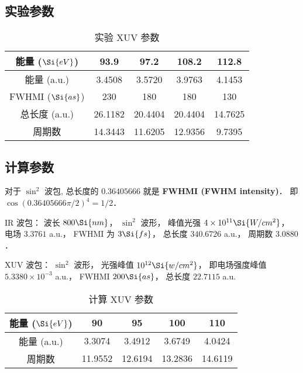 
\subsection{实验参数}
\begin{table}[ht]
\centering
\caption{实验 XUV 参数}\label{Osiand_tab1}
\begin{tabular}{|c|c|c|c|c|}
\hline
能量 ($\Si{eV}$) & 93.9 & 97.2 & 108.2 & 112.8 \\
\hline
能量 (a.u.) & 3.4508 & 3.5720 & 3.9763 & 4.1453 \\
\hline
FWHMI ($\Si{as}$) & 230 & 180 & 180 & 130 \\
\hline
总长度 (a.u.) & 26.1182 & 20.4404 & 20.4404 & 14.7625 \\
\hline
周期数 & 14.3443 & 11.6205 & 12.9356 & 9.7395 \\
\hline
\end{tabular}
\end{table}

\subsection{计算参数}

对于 $\sin^2$ 波包, 总长度的 $0.36405666$ 就是 \textbf{FWHMI (FWHM intensity)}． 即 $\cos(0.36405666 \pi/ 2)^4 = 1/2$．

IR 波包： 波长 $800\Si{nm}$， $\sin^2$ 波形， 峰值光强 $4\times 10^{11} \Si{W/cm^2}$， 电场 $3.3761$ a.u.， FWHMI 为 $3 \Si{fs}$， 总长度 $340.6726$ a.u.， 周期数 $3.0880$．

XUV 波包： $\sin^2$ 波形， 光强峰值 $10^{12} \Si{w/cm^2}$， 即电场强度峰值 $5.3380\times 10^{-3}$ a.u.， FWHMI $200 \Si{as}$， 总长度 $22.7115$ a.u.

\begin{table}[ht]
\centering
\caption{计算 XUV 参数}\label{Osiand_tab2}
\begin{tabular}{|c|c|c|c|c|}
\hline
能量 ($\Si{eV}$) & 90 & 95 & 100 & 110 \\
\hline
能量 (a.u.) & 3.3074 & 3.4912 & 3.6749 & 4.0424\\
\hline
周期数 & 11.9552 & 12.6194 & 13.2836 & 14.6119\\
\hline
\end{tabular}
\end{table}

